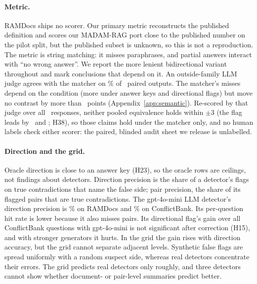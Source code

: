 \paragraph{Metric.} RAMDocs ships no scorer. Our primary metric reconstructs the published definition and scores our
MADAM-RAG port close to the published number on the pilot split, but the published subset is unknown, so this
is not a reproduction. The metric is string matching: it misses paraphrases, and partial answers interact with ``no wrong
answer''. We report the more lenient bidirectional variant throughout and mark conclusions that depend on
it. An outside-family LLM judge agrees with the matcher on \semAgree\% of \semN\ paired outputs. The matcher's
misses depend on the condition (more under answer keys and directional flags) but move no contrast by more than
\semDidMax\ points (Appendix~\ref{app:semantic}). Re-scored by that judge over all \jdN\ responses, neither pooled equivalence holds within
$\pm$3 (the flag leads by \jdThirtyJ\ and \jdTwentyThreeJ; H38), so those claims hold under the matcher only, and
no human labels check either scorer: the paired, blinded audit sheet we release is unlabelled.

\paragraph{Direction and the grid.} Oracle direction is close to an answer key (H23), so the
oracle rows are ceilings, not findings about detectors. Direction precision is the share of a detector's flags on true
contradictions that name the false side; pair precision, the share of its flagged pairs that are
true contradictions. The gpt-4o-mini LLM detector's direction precision is
\dirAccLlm\% on RAMDocs and \cbDirAccLlm\% on ConflictBank. Its per-question hit rate is lower because it also misses pairs. Its directional flag's gain over
all ConflictBank questions with gpt-4o-mini is not significant after correction (H15), and with stronger generators it
hurts. In the grid the gain rises with direction accuracy, but the grid cannot separate adjacent levels.
Synthetic false flags are spread uniformly with a random suspect side, whereas real detectors concentrate their
errors. The grid predicts real detectors only roughly, and three detectors cannot show whether document- or pair-level
summaries predict better.

